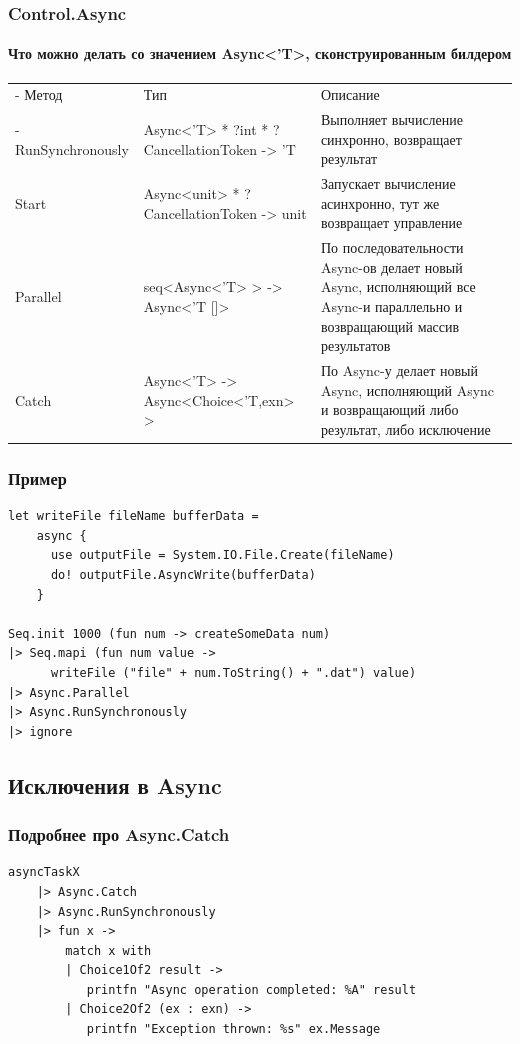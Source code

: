 \documentclass[xetex,mathserif,serif]{beamer}
\begin{document}
	\begin{frame}
		\frametitle{Control.Async}
		\framesubtitle{Что можно делать со значением Async<'T>, сконструированным билдером}
		\begin{footnotesize}
			\begin{tabu} {| X[0.7 l p] | X[1 l p] | X[1 l p] |}
				\tabucline-
				Метод              & Тип                                         & Описание           \\
				\tabucline-
				\everyrow{\tabucline-}
				RunSynchronously   & Async<'T> * ?int * ?CancellationToken -> 'T & Выполняет вычисление синхронно, возвращает результат \\
				Start              & Async<unit> * ?CancellationToken -> unit    & Запускает вычисление асинхронно, тут же возвращает управление \\
				Parallel           & seq<Async<'T> > -> Async<'T []>             & По последовательности Async-ов делает новый Async, исполняющий все Async-и параллельно и возвращающий массив результатов \\
				Catch              & Async<'T> -> Async<Choice<'T,exn> >         & По Async-у делает новый Async, исполняющий Async и возвращающий либо результат, либо исключение \\
			\end{tabu}
		\end{footnotesize}
	\end{frame}

	\begin{frame}[fragile]
		\frametitle{Пример}
		\begin{verbatim}
let writeFile fileName bufferData =
    async {
      use outputFile = System.IO.File.Create(fileName)
      do! outputFile.AsyncWrite(bufferData) 
    }

Seq.init 1000 (fun num -> createSomeData num)
|> Seq.mapi (fun num value -> 
      writeFile ("file" + num.ToString() + ".dat") value)
|> Async.Parallel
|> Async.RunSynchronously
|> ignore
		\end{verbatim}
	\end{frame}

	\subsection{Исключения в Async}

	\begin{frame}[fragile]
		\frametitle{Подробнее про Async.Catch}
		\begin{verbatim}
asyncTaskX
    |> Async.Catch
    |> Async.RunSynchronously
    |> fun x ->
        match x with
        | Choice1Of2 result -> 
           printfn "Async operation completed: %A" result
        | Choice2Of2 (ex : exn) -> 
           printfn "Exception thrown: %s" ex.Message
		\end{verbatim}
	\end{frame}
	
\end{document}
